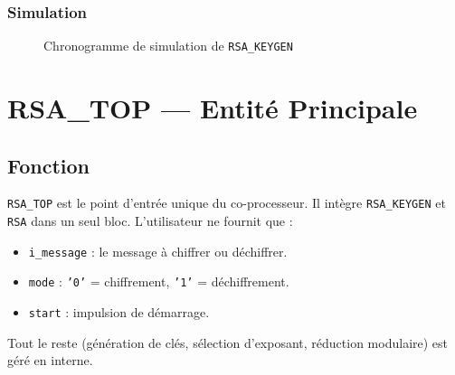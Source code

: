 \subsubsection{Simulation}
\begin{figure}[H]
\centering
{}
\caption{Chronogramme de simulation de \texttt{RSA\_KEYGEN}}
\label{fig:sim_keygen}
\end{figure}


\section{RSA\_TOP --- Entité Principale}
\label{ch:top}

\subsection{Fonction}

\texttt{RSA\_TOP} est le point d'entrée unique du co-processeur. Il intègre
\texttt{RSA\_KEYGEN} et \texttt{RSA} dans un seul bloc. L'utilisateur
ne fournit que :
\begin{itemize}
  \item \texttt{i\_message} : le message à chiffrer ou déchiffrer.
  \item \texttt{mode} : \texttt{'0'} = chiffrement, \texttt{'1'} = déchiffrement.
  \item \texttt{start} : impulsion de démarrage.
\end{itemize}

Tout le reste (génération de clés, sélection d'exposant, réduction modulaire)
est géré en interne.

